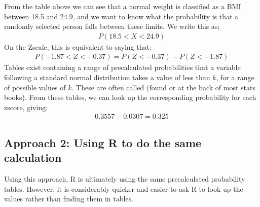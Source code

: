 \documentclass[letterpaper,10pt,english]{jupyterBook}
\begin{document}
\sphinxAtStartPar
From the table above we can see that a normal weight is classified as a BMI between 18.5 and 24.9, and we want to know what the probability is that a randomly selected person falls between these limits. We write this as;
\begin{equation*}
\begin{split}
P(18.5 < X < 24.9) 
\end{split}
\end{equation*}
\sphinxAtStartPar
On the Z\sphinxhyphen{}scale, this is equivalent to saying that:
\begin{equation*}
\begin{split}
P(-1.87 < Z < -0.37) = P(Z < -0.37) - P(Z < -1.87)
\end{split}
\end{equation*}
\sphinxAtStartPar
Tables exist containing a range of pre\sphinxhyphen{}calculated probabilities that a variable following a standard normal distribution takes a value of less than \(k\), for a range of possible values of \(k\). These are often called  (found  or at the back of most stats books). From these tables, we can look up the corresponding probability for each z\sphinxhyphen{}score, giving:
\begin{equation*}
\begin{split}
0.3557 - 0.0307 = 0.325
\end{split}
\end{equation*}

\subsection{Approach 2: Using R to do the same calculation}
\label{\detokenize{03.d. Continuous Probability Distributions:approach-2-using-r-to-do-the-same-calculation}}
\sphinxAtStartPar
Using this approach, R is ultimately using the same pre\sphinxhyphen{}calculated probability tables. However, it is considerably quicker and easier to ask R to look up the values rather than finding them in tables.
\end{document}
